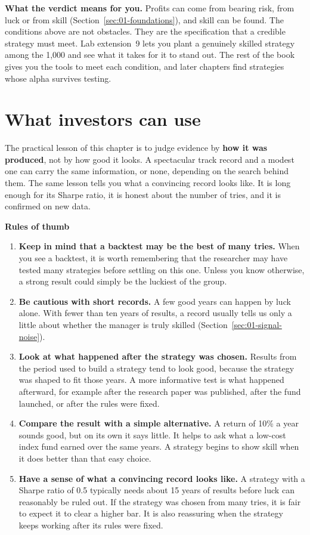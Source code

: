 \textbf{What the verdict means for you.} Profits can come from bearing risk, from luck or from skill (Section~\ref{sec:01-foundations}), and skill can be found. The conditions above are not obstacles. They are the specification that a credible strategy must meet. Lab extension~9 lets you plant a genuinely skilled strategy among the 1,000 and see what it takes for it to stand out. The rest of the book gives you the tools to meet each condition, and later chapters find strategies whose alpha survives testing.

\section{What investors can use}
\label{sec:01-investors}

The practical lesson of this chapter is to judge evidence by \textbf{how it was produced}, not by how good it looks. A spectacular track record and a modest one can carry the same information, or none, depending on the search behind them. The same lesson tells you what a convincing record looks like. It is long enough for its Sharpe ratio, it is honest about the number of tries, and it is confirmed on new data.

\textbf{Rules of thumb}

\begin{enumerate}
  \item \textbf{Keep in mind that a backtest may be the best of many tries.} When you see a backtest, it is worth remembering that the researcher may have tested many strategies before settling on this one. Unless you know otherwise, a strong result could simply be the luckiest of the group.
  \item \textbf{Be cautious with short records.} A few good years can happen by luck alone. With fewer than ten years of results, a record usually tells us only a little about whether the manager is truly skilled (Section~\ref{sec:01-signal-noise}).
  \item \textbf{Look at what happened after the strategy was chosen.} Results from the period used to build a strategy tend to look good, because the strategy was shaped to fit those years. A more informative test is what happened afterward, for example after the research paper was published, after the fund launched, or after the rules were fixed.
  \item \textbf{Compare the result with a simple alternative.} A return of 10\% a year sounds good, but on its own it says little. It helps to ask what a low-cost index fund earned over the same years. A strategy begins to show skill when it does better than that easy choice.
  \item \textbf{Have a sense of what a convincing record looks like.} A strategy with a Sharpe ratio of 0.5 typically needs about 15 years of results before luck can reasonably be ruled out. If the strategy was chosen from many tries, it is fair to expect it to clear a higher bar. It is also reassuring when the strategy keeps working after its rules were fixed.
\end{enumerate}


